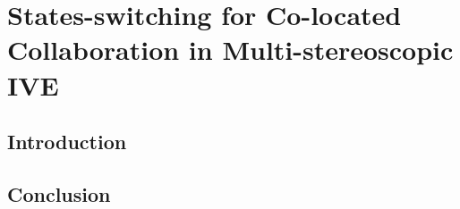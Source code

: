\chapter{States-switching for Co-located Collaboration in Multi-stereoscopic IVE}
\label{chapter:switch}
\minitoc

\section{Introduction}

\section{Conclusion}
